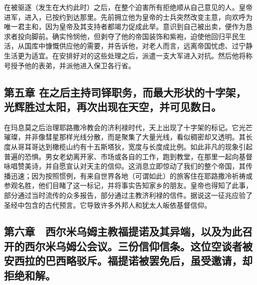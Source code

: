 在被驱逐（发生在大约此时）之后，在整个迫害所有拒绝顺从自己意见的人。皇帝进军，进入，已按约到达那里。先前拥立他为皇帝的士兵突然改变主意，向欢呼为唯一君主和，因为皇帝及其支持者都竭力促成此举。意识到自己被出卖，便作为恳求者投向脚前。确实怜悯他，但剥夺了他的帝国装饰和紫袍，迫使他回归平民生活，从国库中慷慨供应他的需要，并告诉他，对老人而言，远离帝国忧虑、过宁静生活更为适宜。在安排好对的这些处理之后，派遣一支大军进入对抗。然后他将称号授予他的表弟，并派他进入保卫各行省。\par


\subsection{第五章 在之后主持司铎职务，而最大形状的十字架，光辉胜过太阳，再次出现在天空，并可见数日。}

在玛息莫之后治理耶路撒冷教会的济利禄时代，天上出现了十字架的标记。它光芒璀璨，并非像彗星那样光线分散，而是聚集了大量光线，看似稠密却又透明。其长度从哥耳哥达到橄榄山约有十五斯塔狄，宽度与长度成比例。如此非凡的现象引起普遍的恐惧。男女老幼离开家、市场或各自的工作，跑到教堂，在那里一起向基督咏唱赞美诗，并自愿宣认对天主的信仰。这消息立即惊动了我们的整个帝国，其传播迅速；因为按照惯例，有来自世界各地（可谓如此）的旅客住在耶路撒冷祈祷或参观名胜，他们目睹了这一标记，并将事实告知家乡的朋友。皇帝也得知了此事，部分通过当时流传的众多报告，部分通过主教济利禄的信件。据说这一征兆应验了圣经中包含的古代预言。它导致许多外邦人和犹太人皈依基督信仰。\par


\subsection{第六章　西尔米乌姆主教福提诺及其异端，以及为此召开的西尔米乌姆公会议。三份信仰信条。这位空谈者被安西拉的巴西略驳斥。福提诺被罢免后，虽受邀请，却拒绝和解。}


